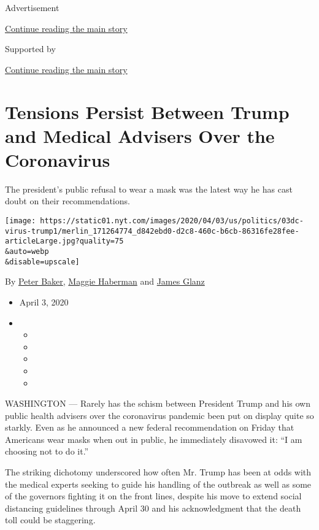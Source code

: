 Advertisement

\protect\hyperlink{after-top}{Continue reading the main story}

Supported by

\protect\hyperlink{after-sponsor}{Continue reading the main story}

\hypertarget{tensions-persist-between-trump-and-medical-advisers-over-the-coronavirus}{%
\section{Tensions Persist Between Trump and Medical Advisers Over the
Coronavirus}\label{tensions-persist-between-trump-and-medical-advisers-over-the-coronavirus}}

The president's public refusal to wear a mask was the latest way he has
cast doubt on their recommendations.

\texttt{[image: https://static01.nyt.com/images/2020/04/03/us/politics/03dc-virus-trump1/merlin\_171264774\_d842ebd0-d2c8-460c-b6cb-86316fe28fee-articleLarge.jpg?quality=75\\\&auto=webp\\\&disable=upscale]}

By \href{https://www.nytimes.com/by/peter-baker}{Peter Baker},
\href{https://www.nytimes.com/by/maggie-haberman}{Maggie Haberman} and
\href{https://www.nytimes.com/by/james-glanz}{James Glanz}

\begin{itemize}
\item
  April 3, 2020
\item
  \begin{itemize}
  \item
  \item
  \item
  \item
  \item
  \end{itemize}
\end{itemize}

WASHINGTON --- Rarely has the schism between President Trump and his own
public health advisers over the coronavirus pandemic been put on display
quite so starkly. Even as he announced a new federal recommendation on
Friday that Americans wear masks when out in public, he immediately
disavowed it: ``I am choosing not to do it.''

The striking dichotomy underscored how often Mr. Trump has been at odds
with the medical experts seeking to guide his handling of the outbreak
as well as some of the governors fighting it on the front lines, despite
his move to extend social distancing guidelines through April 30 and his
acknowledgment that the death toll could be staggering.

